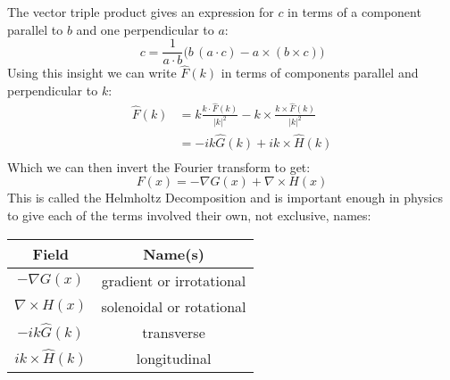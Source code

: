 The vector triple product gives an expression for $c$ in terms of a component parallel to $b$ and one perpendicular to $a$:
\[c = \frac{1}{a\cdot b}\bigg(b\,(a\cdot c) -a \times(b\times c)\bigg)\]
Using this insight we can write $\hat{F}(k)$ in terms of components parallel and perpendicular to $k$:
\[\begin{aligned}
	\hat{F}(k) &= k\frac{k\cdot\hat{F}(k)}{|k|^2}-k\times\frac{k\times\hat{F}(k)}{|k|^2}\\
	&= -ik\hat{G}(k)+ik\times\hat{H}(k)\\
\end{aligned}\]
Which we can then invert the Fourier transform to get:
\[F(x) = -\nabla G(x)+\nabla\times H(x)\]
This is called the Helmholtz Decomposition and is important enough in physics to give each of the terms involved their own,
not exclusive, names:
\begin{center}
\begin{tabular}{|c|c|}
	\hline
	Field & Name(s)\\
	\hline
	\hline
	$-\nabla G(x)$& gradient or irrotational  \\
	\hline
	$\nabla\times H(x)$& solenoidal or rotational\\
	\hline
	$-ik\hat{G}(k)$& transverse\\
	\hline
	$ik\times\hat{H}(k)$& longitudinal\\
	\hline
\end{tabular}
\end{center}


